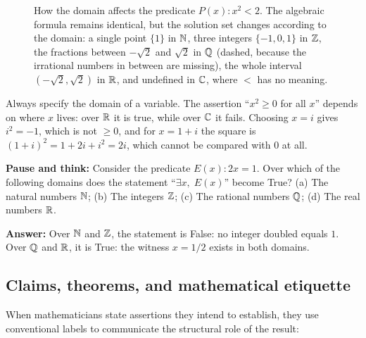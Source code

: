 \begin{figure}[htbp]
\caption{How the domain affects the predicate $P(x) : x^2 < 2$. The algebraic formula remains identical, but the solution set changes according to the domain: a single point $\{1\}$ in $\mathbb{N}$, three integers $\{-1, 0, 1\}$ in $\mathbb{Z}$, the fractions between $-\sqrt{2}$ and $\sqrt{2}$ in $\mathbb{Q}$ (dashed, because the irrational numbers in between are missing), the whole interval $(-\sqrt{2}, \sqrt{2})$ in $\mathbb{R}$, and undefined in $\mathbb{C}$, where $<$ has no meaning.}
\label{02:fig-domain-changes-everything}
\end{figure}

\begin{trapbox}
Always specify the domain of a variable. The assertion ``$x^2 \ge 0$ for all $x$'' depends on where $x$ lives: over $\mathbb{R}$ it is true, while over $\mathbb{C}$ it fails. Choosing $x = i$ gives $i^2 = -1$, which is not $\ge 0$, and for $x = 1 + i$ the square is $(1 + i)^2 = 1 + 2i + i^2 = 2i$, which cannot be compared with $0$ at all.
\end{trapbox}

\begin{recoverybox}
\textbf{Pause and think:} Consider the predicate $E(x) : 2x = 1$. Over which of the following domains does the statement ``$\exists x,\; E(x)$'' become True?
(a) The natural numbers $\mathbb{N}$; (b) The integers $\mathbb{Z}$; (c) The rational numbers $\mathbb{Q}$; (d) The real numbers $\mathbb{R}$.

\textbf{Answer:} Over $\mathbb{N}$ and $\mathbb{Z}$, the statement is False: no integer doubled equals $1$. Over $\mathbb{Q}$ and $\mathbb{R}$, it is True: the witness $x = 1/2$ exists in both domains.
\end{recoverybox}

\subsection{Claims, theorems, and mathematical etiquette}

When mathematicians state assertions they intend to establish, they use conventional labels to communicate the structural role of the result:

